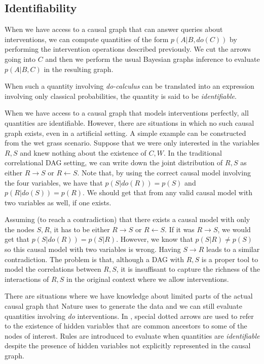 \documentclass[a4paper, 10pt]{article}
\begin{document}
\subsection{Identifiability}

	When we have access to a causal graph that can answer queries about
interventions, we can compute quantities of the form $p(A|B,do(C))$ by
performing the intervention operations described previously. We cut the arrows
going into $C$ and then we perform the usual Bayesian graphs inference to
evaluate $p(A|B,C)$ in the resulting graph.

When such a quantity involving \textit{do-calculus} can be translated into an
expression involving only classical probabilities, the quantity is said
to be \textit{identifiable}.

When we have access to a causal graph that models interventions perfectly, all
quantities are identifiable. However, there are situations in which no such
causal graph exists, even in a artificial setting. A simple example can be
constructed from the wet grass
scenario. Suppose that we were only interested in the variables $R,S$ and knew
nothing about the existence of $C,W$. In the traditional correlational DAG
setting, we can write down the joint distribution of $R,S$ as either $R
\rightarrow S$ or $R \leftarrow S$. Note
that, by using the correct causal model involving the four variables, we have
that $p(S|do(R)) = p(S)$ and $p(R|do(S)) = p(R)$. We should get that from any
valid causal model with two variables as well, if one exists.

Assuming (to reach a contradiction) that there exists a causal model with only
the nodes $S,R$, it has to be either $R \rightarrow S$ or $R \leftarrow S$. If
it was $R \rightarrow S$, we would
get that $p(S|do(R))=p(S|R)$. However, we know that $p(S|R) \neq p(S)$ so this
causal model with two variables is wrong. Having $S \rightarrow R$ leads to a
similar contradiction. The problem is that, although a DAG with $R,S$ is a
proper tool to model the correlations between $R,S$, it is insuffisant to
capture the richness of the interactions of $R,S$ in the original context where
we allow interventions.

There are situations where we have knowledge about limited parts of the actual
causal graph that Nature uses to generate the data and we can still evaluate
quantities involving \textit{do} interventions. In \cite{pearl2000cmr}, special
dotted arrows
are used to refer to the existence of hidden variables that are common
ancestors to some of the nodes of interest. Rules are introduced to evaluate
when quantities are \textit{identifiable} despite the presence of hidden
variables not explicitly represented in the causal graph.
\end{document}
